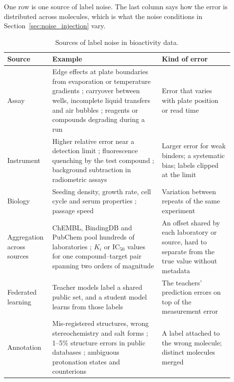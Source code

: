 One row is one source of label noise. The last column says how the error is distributed across molecules, which is what the noise conditions in Section~\ref{sec:noise_injection} vary.
\begin{table}[htbp]
\centering
\small
\caption[Sources of label noise in bioactivity data.]{Sources of label noise in bioactivity data.}
\label{tab:noise_sources}
\begin{adjustbox}{max width=\textwidth}
\begin{tabular}{@{}P{0.16\linewidth}P{0.46\linewidth}P{0.30\linewidth}@{}}
\toprule
Source & Example & Kind of error \\
\midrule
Assay & Edge effects at plate boundaries from evaporation or temperature gradients \citep{Macarron2011}; carryover between wells, incomplete liquid transfers and air bubbles \citep{Inglese2006}; reagents or compounds degrading during a run \citep{Brideau2003} & Error that varies with plate position or read time \\
Instrument & Higher relative error near a detection limit \citep{Zhang1999}; fluorescence quenching by the test compound \citep{Simeonov2008}; background subtraction in radiometric assays \citep{Zhang1999} & Larger error for weak binders; a systematic bias; labels clipped at the limit \\
Biology & Seeding density, growth rate, cell cycle and serum properties \citep{Hatzis2014}; passage speed \citep{Postnikova2018} & Variation between repeats of the same experiment \\
Aggregation across sources & ChEMBL, BindingDB and PubChem pool hundreds of laboratories \citep{Gaulton2017, Gilson2016}; $K_i$ or IC$_{50}$ values for one compound--target pair spanning two orders of magnitude \citep{Kramer2012} & An offset shared by each laboratory or source, hard to separate from the true value without metadata \citep{Fourches2016} \\
Federated learning & Teacher models label a shared public set, and a student model learns from those labels \citep{Bassani2023} & The teachers' prediction errors on top of the measurement error \\
Annotation & Mis-registered structures, wrong stereochemistry and salt forms \citep{Williams2017}; 1--5\% structure errors in public databases \citep{Young2008}; ambiguous protonation states and counterions \citep{Bento2020} & A label attached to the wrong molecule; distinct molecules merged \\
\bottomrule
\end{tabular}
\end{adjustbox}
\end{table}

